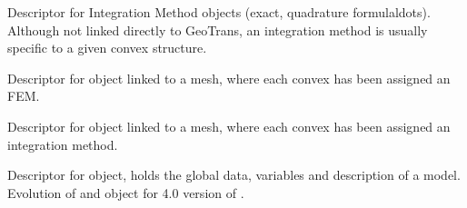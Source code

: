 \documentclass[a4paper,11pt,english]{sphinxmanual}
\begin{document}

\begin{fulllineitems}
\label{\detokenize{python/pygf:Integ}}
Descriptor for Integration Method objects (exact, quadrature formulaldots).
Although not linked directly to GeoTrans, an integration method is usually
specific to a given convex structure.

\end{fulllineitems}


\begin{fulllineitems}
\label{\detokenize{python/pygf:MeshFem}}
Descriptor for object linked to a mesh, where each convex has been assigned
an FEM.

\end{fulllineitems}


\begin{fulllineitems}
\label{\detokenize{python/pygf:MeshIm}}
Descriptor for object linked to a mesh, where each convex has been assigned
an integration method.

\end{fulllineitems}


\begin{fulllineitems}
\label{\detokenize{python/pygf:Model}}
Descriptor for  object, holds the global data, variables and
description of a model. Evolution of  and 
object for 4.0 version of .

\end{fulllineitems}
\end{document}
